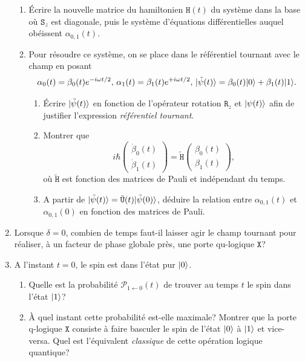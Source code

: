 \begin{enumerate}
\begin{enumerate}
\item Écrire la nouvelle matrice du hamiltonien $\mathtt{H}(t)$ du système dans
la base où $\mathtt{S}_z$ est diagonale, puis le système d'équations
différentielles auquel obéissent $\alpha_{0,1}(t)$.

\item Pour résoudre ce système, on se place dans le référentiel tournant avec le
champ en posant
\begin{equation}
\alpha_0(t)=\beta_0(t)e^{-i\omega t/2},\,\alpha_1(t)=\beta_1(t)e^{+i\omega
t/2},\,\vert\tilde{\psi}(t)\rangle=\beta_0(t)\vert0\rangle+\beta_1(t)\vert1\rangle.
\end{equation}

\begin{enumerate}
\item Écrire $\vert\tilde{\psi}(t)\rangle$ en fonction de l'opérateur rotation
$\mathtt{R}_z$ et $\vert\psi(t)\rangle$ afin de justifier l'expression
\emph{référentiel tournant}.
\item Montrer que
\begin{equation}
i\hbar\begin{pmatrix}\dot{\beta}_0(t)\\\dot{\beta}_1(t)\end{pmatrix}
=\tilde{\mathtt{H}}\begin{pmatrix}\beta_0(t)\\\beta_1(t)\end{pmatrix},
\end{equation}
où $\tilde{\mathtt{H}}$ est fonction des matrices de Pauli et indépendant du
temps.

\item A partir de $\vert\tilde{\psi}(t)\rangle=\tilde{\mathtt{U}}(t)
\vert\tilde{\psi}(0)\rangle$, déduire la relation entre $\alpha_{0,1}(t)$ et
$\alpha_{0,1}(0)$ en fonction des matrices de Pauli.
\end{enumerate}
\end{enumerate}

\item Lorsque $\delta=0$, combien de temps faut-il laisser agir le champ
tournant pour réaliser, à un facteur de phase globale près, une porte qu-logique
$\mathtt{X}$?

\item A l'instant $t=0$, le spin est dans l'état pur $\vert0\rangle$.

\begin{enumerate}
\item Quelle est la probabilité $\mathcal{P}_{1\leftarrow0}(t)$ de trouver au
temps $t$ le spin dans l'état $\vert1\rangle$?

\item À quel instant cette probabilité est-elle maximale? Montrer que la porte
q-logique $\mathtt{X}$ consiste à faire basculer le spin de l'état $\vert0\rangle$ à
$\vert1\rangle$ et vice-versa. Quel est l'équivalent \emph{classique} de cette
opération logique quantique?
\end{enumerate}
\end{enumerate}

